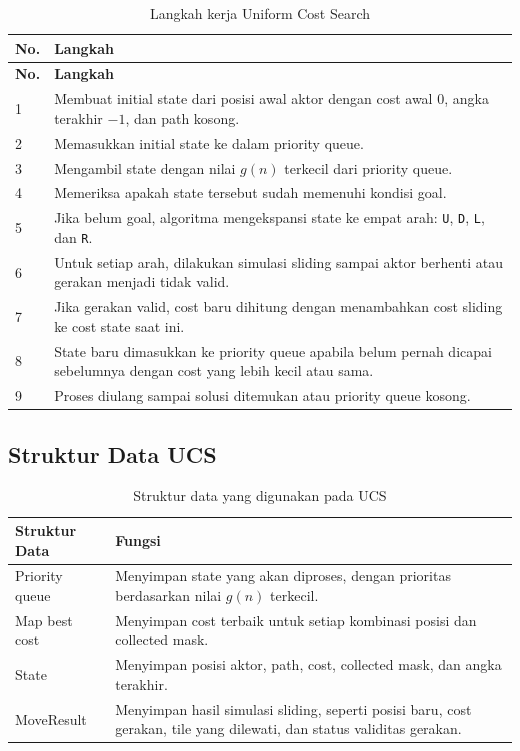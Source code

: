 \begin{longtable}{|p{1.2cm}|p{12.8cm}|}
	\caption{Langkah kerja Uniform Cost Search} \\
	\hline
	\rowcolor{green!15}
	\textbf{No.} & \textbf{Langkah} \\
	\hline
	\endfirsthead
	
	\hline
	\rowcolor{green!15}
	\textbf{No.} & \textbf{Langkah} \\
	\hline
	\endhead
	
	1 & Membuat initial state dari posisi awal aktor dengan cost awal $0$, angka terakhir $-1$, dan path kosong. \\
	\hline
	2 & Memasukkan initial state ke dalam priority queue. \\
	\hline
	3 & Mengambil state dengan nilai $g(n)$ terkecil dari priority queue. \\
	\hline
	4 & Memeriksa apakah state tersebut sudah memenuhi kondisi goal. \\
	\hline
	5 & Jika belum goal, algoritma mengekspansi state ke empat arah: \texttt{U}, \texttt{D}, \texttt{L}, dan \texttt{R}. \\
	\hline
	6 & Untuk setiap arah, dilakukan simulasi sliding sampai aktor berhenti atau gerakan menjadi tidak valid. \\
	\hline
	7 & Jika gerakan valid, cost baru dihitung dengan menambahkan cost sliding ke cost state saat ini. \\
	\hline
	8 & State baru dimasukkan ke priority queue apabila belum pernah dicapai sebelumnya dengan cost yang lebih kecil atau sama. \\
	\hline
	9 & Proses diulang sampai solusi ditemukan atau priority queue kosong. \\
	\hline
\end{longtable}

\subsection{Struktur Data UCS}

\begin{table}[H]
	\centering
	\caption{Struktur data yang digunakan pada UCS}
	\begin{tabular}{|p{4cm}|p{10cm}|}
		\hline
		\rowcolor{green!15}
		\textbf{Struktur Data} & \textbf{Fungsi} \\
		\hline
		Priority queue & Menyimpan state yang akan diproses, dengan prioritas berdasarkan nilai $g(n)$ terkecil. \\
		\hline
		Map best cost & Menyimpan cost terbaik untuk setiap kombinasi posisi dan collected mask. \\
		\hline
		State & Menyimpan posisi aktor, path, cost, collected mask, dan angka terakhir. \\
		\hline
		MoveResult & Menyimpan hasil simulasi sliding, seperti posisi baru, cost gerakan, tile yang dilewati, dan status validitas gerakan. \\
		\hline
	\end{tabular}
\end{table}

